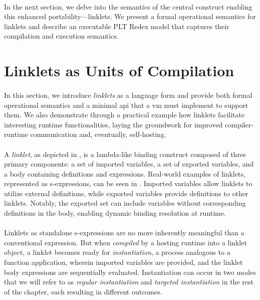 		\paragraph{}%
			In the next section, we delve into the semantics of the central construct enabling this enhanced portability—linklets. We present a formal operational semantics for linklets and describe an executable PLT Redex model that captures their compilation and execution semantics.

	\section[\texorpdfstring{Linklets as Units of Compilation}{Using Linklets}]{Linklets as Units of Compilation}
		\label{section:linklet-semantics}

		\paragraph{}%
			In this section, we introduce \emph{linklets} as a language form and provide both formal operational semantics and a minimal \gls{api} that a \gls{vm} must implement to support them. We also demonstrate through a practical example how linklets facilitate interesting runtime functionalities, laying the groundwork for improved compiler-runtime communication and, eventually, self-hosting.


		\paragraph{}%
			A \emph{linklet}, as depicted in , is a lambda-like binding construct composed of three primary components: a set of imported variables, a set of exported variables, and a body containing definitions and expressions. Real-world examples of linklets, represented as s-expressions, can be seen in . Imported variables allow linklets to utilize external definitions, while exported variables provide definitions to other linklets. Notably, the exported set can include variables without corresponding definitions in the body, enabling dynamic binding resolution at runtime.

		\paragraph{}%
			Linklets as standalone s-expressions are no more inherently meaningful than a conventional  expression. But when \emph{compiled} by a hosting runtime into a linklet object, a linklet becomes ready for \emph{instantiation}, a process analogous to a function application, wherein imported variables are provided, and the linklet body expressions are sequentially evaluated. Instantiation can occur in two modes that we will refer to as \emph{regular instantiation} and \emph{targeted instantiation} in the rest of the chapter, each resulting in different outcomes.

